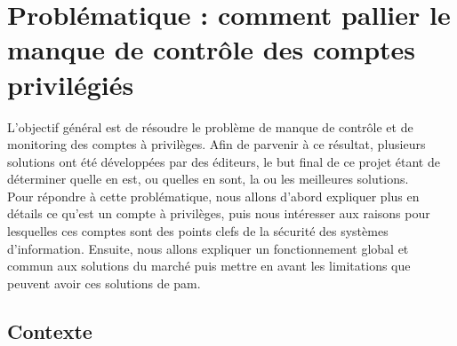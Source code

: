 %
%
%
%
%
%

\section{Problématique : comment pallier le manque de contrôle des comptes privilégiés}

L'objectif général est de résoudre le problème de manque de contrôle et de monitoring des comptes à privilèges. Afin de parvenir à ce résultat, plusieurs solutions ont été développées par des éditeurs, le but final de ce projet étant de déterminer quelle en est, ou quelles en sont, la ou les meilleures solutions.\\
Pour répondre à cette problématique, nous allons d'abord expliquer plus en détails ce qu'est un compte à privilèges, puis nous intéresser aux raisons pour lesquelles ces comptes sont des points clefs de la sécurité des systèmes d'information. Ensuite, nous allons expliquer un fonctionnement global et commun aux solutions du marché puis mettre en avant les limitations que peuvent avoir ces solutions de \gls{pam}.

\subsection{Contexte}

